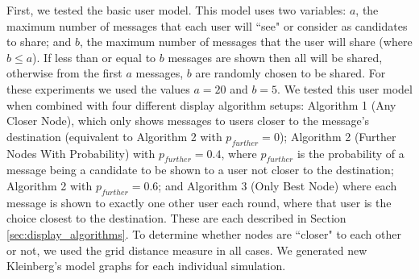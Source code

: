 \documentclass[bsc,frontabs,twoside,singlespacing,parskip,deptreport]{infthesis}     %
\begin{document}
First, we tested the basic user model. This model uses two variables: $a$, the maximum number of messages that each user will ``see" or consider as candidates to share; and $b$, the maximum number of messages that the user will share (where $b \leq a$). If less than or equal to $b$ messages are shown then all will be shared, otherwise from the first $a$ messages, $b$ are randomly chosen to be shared. For these experiments we used the values $a = 20$ and $b = 5$. We tested this user model when combined with four different display algorithm setups: Algorithm 1 (Any Closer Node), which only shows messages to users closer to the message's destination (equivalent to Algorithm 2 with $p_{further}=0$); Algorithm 2 (Further Nodes With Probability) with $p_{further}=0.4$, where $p_{further}$ is the probability of a message being a candidate to be shown to a user not closer to the destination; Algorithm 2 with $p_{further}=0.6$; and Algorithm 3 (Only Best Node) where each message is shown to exactly one other user each round, where that user is the choice closest to the destination. These are each described in Section \ref{sec:display_algorithms}. To determine whether nodes are ``closer" to each other or not, we used the grid distance measure in all cases. We generated new Kleinberg's model graphs for each individual simulation.
\end{document}
